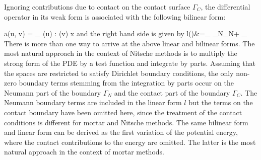 \documentclass[12pt]{article}
\newenvironment{alignno}{\linenomath\align}{\endalign\linenomath}
\newcommand{\mbf}[1]{\mathbf{#1}}
\newcommand{\Int}[1]{\int\limits_{ #1}}
\newcommand{\mrm}[1]{\mathrm{#1}}
\newcommand{\mbv}{\mbf{v}}
\newcommand{\md}{\mrm{d}}
\begin{document}
Ignoring contributions due to contact on the contact surface $\Gamma_C$, the differential operator in its weak form is associated with the following bilinear form:

\begin{alignno}
  a(\bm u, \bm v) = \int_{\Omega} \sigma (\bm u) : \epsilon (\bm v) \md x
\end{alignno}
 and the right hand side is given by
\begin{alignno}
          l(\mbv)&=\Int{\Gamma_N}{}\mbf{f}_N\cdot \mbv\md \Gamma + \Int{\Omega}{} \mbf{f} \cdot \mbv\mrm{dx}
\end{alignno}
There is more than one way to arrive at the above linear and bilinear forms. The most natural approach in the context of Nitsche methods is to multiply the strong form of the PDE by a test function and integrate by parts. Assuming that the spaces are restricted to satisfy Dirichlet boundary conditions, the only non-zero boundary terms stemming from the integration by parts occur on the Neumann part of the boundary $\Gamma_N$ and the contact part of the boundary $\Gamma_C$. The Neumann boundary terms are included in the linear form $l$ but the terms on the contact boundary have been omitted here, since the treatment of the contact conditions is different for mortar and Nitsche methods. The same bilinear form and linear form can be derived as the first variation of the potential energy, where the contact contributions to the energy are omitted. The latter is the most natural approach in the context of mortar methods.

\end{document}
